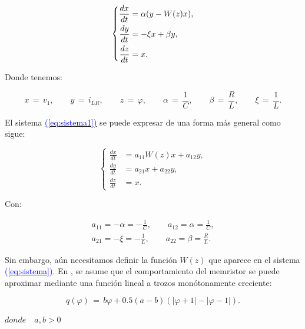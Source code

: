 \documentclass[12pt,a4paper]{report} %
\newcommand{\eref}[1]{\hyperref[#1]{\textcolor{blue}{(\ref*{#1})}}}
\newcommand{\eref}[1]{\hyperref[#1]{\textcolor{blue}{\textit{(\ref*{#1})}}}}
\begin{document}
	\begin{equation}
		\label{eq:sistema1}
		\scalebox{1}{$\displaystyle
			\left\{
			\begin{aligned}
				\frac{dx}{dt} &= \alpha (y - W(z)x), \\
				\frac{dy}{dt} &= -\xi x + \beta y, \\
				\frac{dz}{dt} &= x.
			\end{aligned}
			\right.
			$}
	\end{equation}\smallskip
	
	\noindent Donde tenemos:
	
	\begin{equation*}
		x\,=\,v_1, \qquad y\,=\,i_{LR}, \qquad z\,=\,\varphi, \qquad \alpha\,=\,\frac{1}{C}, \qquad \beta\,=\,\frac{R}{L}, \qquad \xi\,=\,\frac{1}{L}.
	\end{equation*}\smallskip
	
	\noindent El sistema \eref{eq:sistema1} se puede expresar de una forma más general como sigue:
	
	\begin{equation}
		\label{eq:sistema}
			\left\{
			\begin{aligned}
				\frac{dx}{dt} &= a_{11}W(z)x+a_{12}y, \\
				\frac{dy}{dt} &=  a_{21}x+ a_{22}y, \\
				\frac{dz}{dt} &= x.
			\end{aligned}
			\right.
	\end{equation}\smallskip
	
	\noindent Con:
	
	\begin{equation}
		\label{eq:amatriz}
	\begin{gathered}
		a_{11}=-\alpha=-\frac{1}{C}, \qquad a_{12}=\alpha=\frac{1}{C},\\[2mm]
		a_{21}=-\xi =-\frac{1}{L}, \qquad a_{22}=\beta = \frac{R}{L}.
	\end{gathered}
	\end{equation}\smallskip
	
	\newpage
	
	Sin embargo, aún necesitamos definir la función $W(z)$ que aparece en el sistema \eref{eq:sistema}. En \cite{chuaoscillator2008}, se asume que el comportamiento del memristor se puede aproximar mediante una función lineal a trozos monótonamente creciente:
	
	\begin{equation}
		q(\varphi)\,=\,b\varphi+0.5(a-b)(|\varphi+1|-|\varphi-1|).
		\label{eq:qf}
	\end{equation}
    \begin{center}
    	$ donde \quad a,b> 0$
    \end{center}\smallskip
    
\end{document}
